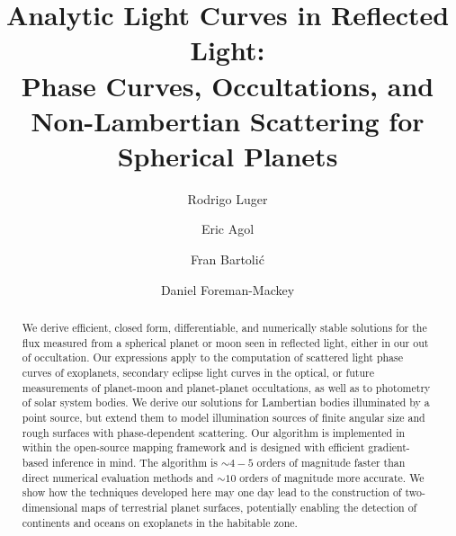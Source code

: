 \documentclass[modern]{aastex62}
\begin{document}
\title{%
    \textbf{
        Analytic Light Curves in Reflected Light:%
        \\%
        Phase Curves, Occultations, and Non-Lambertian Scattering for Spherical Planets
    }
}

\author[0000-0002-0296-3826]{Rodrigo Luger}
%
\author[0000-0002-0802-9145]{Eric Agol}
%
\author[0000-0001-8630-9794]{Fran Bartoli\'c}
%
\author[0000-0002-9328-5652]{Daniel Foreman-Mackey}


\begin{abstract}
    We derive efficient, closed form, differentiable, and numerically stable
    solutions for the flux measured from a spherical planet or moon seen in reflected
    light, either in our out of occultation.
    Our expressions apply to the computation of scattered
    light phase curves of exoplanets, secondary eclipse light curves in
    the optical, or future measurements of planet-moon and planet-planet
    occultations, as well as to photometry of solar system bodies.
    We derive our solutions for Lambertian bodies illuminated by a point
    source, but extend them to model illumination sources of finite
    angular size and rough surfaces with phase-dependent scattering.
    Our algorithm is implemented in \Python within the open-source
    \starry mapping framework and is designed with efficient gradient-based
    inference in mind.
    The algorithm is ${\sim}4-5$ orders of magnitude faster than direct
    numerical evaluation methods and ${\sim}10$ orders of magnitude more
    accurate.
    We show how the techniques developed here may one day lead to the
    construction of two-dimensional maps of terrestrial planet surfaces,
    potentially enabling the detection of continents and oceans on
    exoplanets in the habitable zone.
    \href{https://github.com/rodluger/starrynight}{\color{linkcolor}\faGithub}
\end{abstract}
\end{document}
